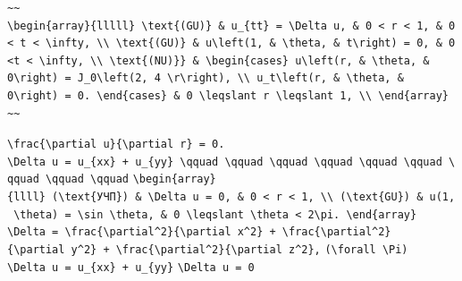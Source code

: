 \documentclass[
  ukrainian,
]{article}
\begin{document}
\begin{verbatim}
~~
\begin{array}{lllll} \text{(GU)} & u_{tt} = \Delta u, & 0 < r < 1, & 0 < t < \infty, \\ \text{(GU)} & u\left(1, & \theta, & t\right) = 0, & 0 <t < \infty, \\ \text{(NU)}} & \begin{cases} u\left(r, & \theta, & 0\right) = J_0\left(2, 4 \r\right), \\ u_t\left(r, & \theta, & 0\right) = 0. \end{cases} & 0 \leqslant r \leqslant 1, \\ \end{array}
~~
\end{verbatim}

\texttt{\textbackslash{}frac\{\textbackslash{}partial\ u\}\{\textbackslash{}partial\ r\}\ =\ 0.}
\texttt{\textbackslash{}Delta\ u\ =\ u\_\{xx\}\ +\ u\_\{yy\}\ \textbackslash{}qquad\ \textbackslash{}qquad\ \textbackslash{}qquad\ \textbackslash{}qquad\ \textbackslash{}qquad\ \textbackslash{}qquad\ \textbackslash{}qquad\ \textbackslash{}qquad\ \textbackslash{}qquad}
\texttt{\textbackslash{}begin\{array\}\{llll\}\ (\textbackslash{}text\{УЧП\})\ \&\ \textbackslash{}Delta\ u\ =\ 0,\ \&\ 0\ \textless{}\ r\ \textless{}\ 1,\ \textbackslash{}\textbackslash{}\ (\textbackslash{}text\{GU\})\ \&\ u(1,\ \textbackslash{}theta)\ =\ \textbackslash{}sin\ \textbackslash{}theta,\ \&\ 0\ \textbackslash{}leqslant\ \textbackslash{}theta\ \textless{}\ 2\textbackslash{}pi.\ \textbackslash{}end\{array\}}
\texttt{\textbackslash{}Delta\ =\ \textbackslash{}frac\{\textbackslash{}partial\^{}2\}\{\textbackslash{}partial\ x\^{}2\}\ +\ \textbackslash{}frac\{\textbackslash{}partial\^{}2\}\{\textbackslash{}partial\ y\^{}2\}\ +\ \textbackslash{}frac\{\textbackslash{}partial\^{}2\}\{\textbackslash{}partial\ z\^{}2\},}
\texttt{(\textbackslash{}forall\ \textbackslash{}Pi)}
\texttt{\textbackslash{}Delta\ u\ =\ u\_\{xx\}\ +\ u\_\{yy\}}
\texttt{\textbackslash{}Delta\ u\ =\ 0}
\end{document}
